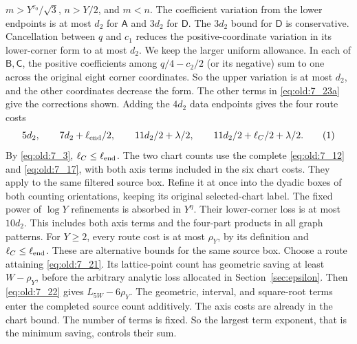 \(m>Y^{\tau_0}/\sqrt3\), \(n>Y/2\), and \(m<n\). The coefficient
variation from the lower endpoints is at most \(d_2\) for \(\mathsf A\)
and \(3d_2\) for \(\mathsf D\). The \(3d_2\) bound for \(\mathsf D\) is
conservative. Cancellation between \(q\) and \(c_1\) reduces
the positive-coordinate variation in its lower-corner form to at most
\(d_2\). We keep the larger uniform allowance. In each of
\(\mathsf B,\mathsf C\),
the positive coefficients among \(q/4-c_2/2\) (or its negative) sum to
one across the original eight corner coordinates. So the upper variation is
at most \(d_2\), and the other coordinates decrease the
form. The other terms in \eqref{eq:old:7_23a} give the corrections shown.
Adding the \(4d_2\) data endpoints gives the
four route costs
\[
5d_2,\qquad 7d_2+\ell_{\rm end}/2,\qquad
11d_2/2+\lambda/2,\qquad
11d_2/2+\ell_C/2+\lambda/2.
\AutoTag{eq:old:7_23c}
\]
By \eqref{eq:old:7_3}, \(\ell_C\le\ell_{\rm end}\).
The two chart counts use the complete \eqref{eq:old:7_12} and
\eqref{eq:old:7_17}, with both axis terms included in the six chart
costs. They apply to the same filtered source box. Refine it at once
into the dyadic boxes of both counting orientations, keeping its original
selected-chart label. The fixed power of \(\log Y\) refinements is
absorbed in \(Y^\eta\). Their lower-corner loss is at most \(10d_2\).
This includes both axis terms and the four-part products in all graph
patterns. For \(Y\ge2\), every route cost is at most
\(\rho_Y\), by its definition and \(\ell_C\le\ell_{\rm end}\).
These are alternative bounds for the same source box.
Choose a route attaining \eqref{eq:old:7_21}. Its lattice-point count has
geometric saving at least \(W-\rho_Y\), before the arbitrary analytic
loss allocated in Section~\ref{sec:epsilon}. Then \eqref{eq:old:7_22}
gives \(L_{5W}-6\rho_Y\). The geometric,
interval, and square-root terms enter the completed source count
additively. The axis costs are already in the chart bound. The
number of terms is fixed. So the largest term exponent, that is the
minimum saving, controls their sum.

